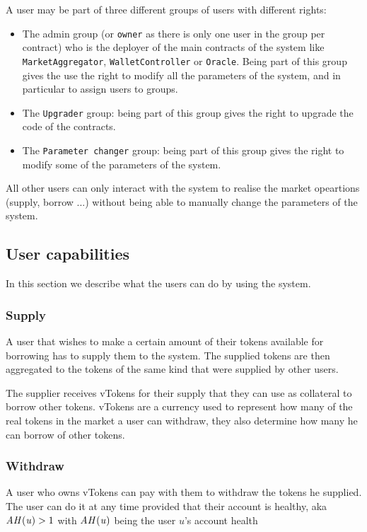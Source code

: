 A user may be part of three different groups of users with different rights:
\begin{itemize}
  \item The admin group (or \verb|owner| as there is only one user in the group per contract) who is the deployer of the main contracts of the system like \verb|MarketAggregator|, \verb|WalletController| or \verb|Oracle|. Being part of this group gives the use the right to modify all the parameters of the system, and in particular to assign users to groups.
  \item The \verb|Upgrader| group: being part of this group gives the right to upgrade the code of the contracts.
  \item The \verb|Parameter changer| group: being part of this group gives the right to modify some of the parameters of the system.
\end{itemize}

All other users can only interact with the system to realise the market opeartions (supply, borrow ...) without being able to manually change the parameters of the system.

\subsection{User capabilities}

In this section we describe what the users can do by using the system.

\subsubsection{Supply}

A user that wishes to make a certain amount of their tokens available for borrowing has to supply them to the system. The supplied tokens are then aggregated to the tokens of the same kind that were supplied by other users.

The supplier receives vTokens for their supply that they can use as collateral to borrow other tokens. vTokens are a currency used to represent how many of the real tokens in the market a user can withdraw, they also determine how many he can borrow of other tokens.

\subsubsection{Withdraw}

A user who owns vTokens can pay with them to withdraw the tokens he supplied. The user can do it at any time provided that their account is healthy, aka $\mathit{AH(u)} > 1$ with $\mathit{AH(u)}$ being the user $u$'s account health

